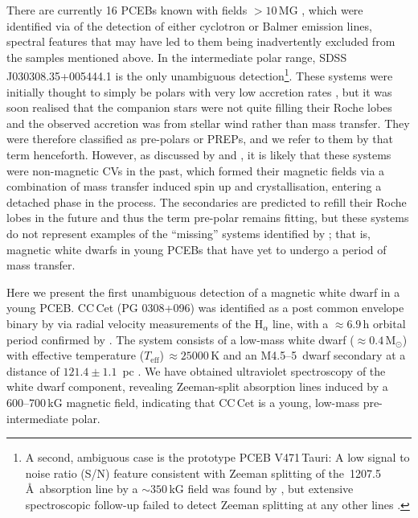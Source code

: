 \documentclass[fleqn,usenatbib]{mnras}
\newcommand{\Msun}{\mbox{$\mathrm{M}_{\odot}$}}
\newcommand{\Teff}{\mbox{$T_{\mathrm{eff}}$}}
\begin{document}
There are currently 16 PCEBs known with fields $ > 10$\,MG \citep{reimersetal99-1, reimers+hagen00-1, schmidtetal05-1, schmidtetal07-1, schwopeetal09-1, parsonsetal21-1}, which were identified via of the detection of either cyclotron or Balmer emission lines, spectral features that may have led to them being inadvertently excluded from the samples mentioned above. In the intermediate polar range, SDSS\,J030308.35+005444.1 \citep[$B = 8$\,MG,][]{parsonsetal13-1} is the only unambiguous detection\footnote{A second, ambiguous case is the prototype PCEB V471\,Tauri: A low signal to noise ratio (S/N) feature consistent with Zeeman splitting of the \,1207.5\,\AA\ absorption line by a $\sim 350$\,kG field was found by \citet{sionetal98-2}, but extensive spectroscopic follow-up failed to detect Zeeman splitting at any other lines \citep{sionetal12-1}.}. These systems were initially thought to simply be polars with very low accretion rates \citep[``LARPs'', e.g. ][]{reimersetal99-1}, but it was soon realised that the companion stars were not quite filling their Roche lobes \citep[e.g. ][]{vogeletal07-1} and the observed accretion was from stellar wind rather than mass transfer. They were therefore classified as pre-polars or PREPs, and we refer to them by that term henceforth. However, as discussed by \citet{parsonsetal21-1} and \citet{schreiberetal21-1},  it is likely that these systems were non-magnetic CVs in the past, which formed their magnetic fields via a combination of mass transfer induced spin up and crystallisation, entering a detached phase in the process. The secondaries are predicted to refill their Roche lobes in the future and thus the term pre-polar remains fitting, but these systems do not represent examples of the ``missing'' systems identified by \citet{liebertetal05-2}; that is, magnetic white dwarfs in young PCEBs that have yet to undergo a period of mass transfer.         

Here we present the first unambiguous detection of a magnetic white dwarf in a young PCEB. CC\,Cet (PG 0308+096) was identified as a post common envelope binary by \citet{safferetal93-1} via radial velocity measurements of the H$_{\alpha}$ line, with a $\approx 6.9$\,h orbital period confirmed by \citet{somersetal96-2}. The system consists of a low-mass white dwarf ($\approx 0.4$\,\Msun) with effective temperature (\Teff)\,$\approx 25000$\,K and an M4.5--5\, dwarf secondary \citep{tappertetal07-2} at a distance of $121.4\pm 1.1$~pc \citep{gaia18-1}. We have obtained ultraviolet spectroscopy of the white dwarf component, revealing Zeeman-split absorption lines induced by a 600--700\,kG magnetic field, indicating that CC\,Cet is a young, low-mass pre-intermediate polar. 
\end{document}
